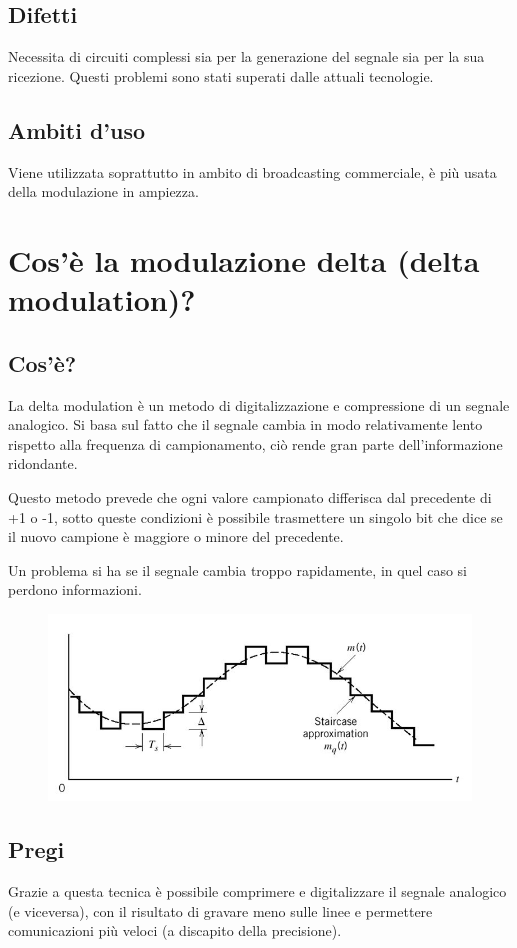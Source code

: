 \subsection{Difetti}
Necessita di circuiti complessi sia per la generazione del segnale sia per la sua ricezione. Questi problemi sono stati superati dalle attuali tecnologie.
\subsection{Ambiti d'uso}
Viene utilizzata soprattutto in ambito di broadcasting commerciale, è più usata della modulazione in ampiezza.

\section{Cos’è la modulazione delta (delta modulation)?}
\subsection{Cos'è?}
La delta modulation è un metodo di digitalizzazione e compressione di un segnale analogico.
Si basa sul fatto che il segnale cambia in modo relativamente lento rispetto alla frequenza di campionamento, ciò rende gran parte dell’informazione ridondante.

Questo metodo prevede che ogni valore campionato differisca dal precedente di +1 o -1, sotto queste condizioni è possibile trasmettere un singolo bit che dice se il nuovo campione è maggiore o minore del precedente.

Un problema si ha se il segnale cambia troppo rapidamente, in quel caso si perdono informazioni.

\begin{figure}[H]
\centering
\includegraphics[scale=0.6]{res/img/6_modulazioneDelta.png}
\end{figure}

 \subsection{Pregi}
 Grazie a questa tecnica è possibile comprimere e digitalizzare il segnale analogico (e viceversa), con il risultato di gravare meno sulle linee e permettere comunicazioni più veloci (a discapito della precisione).
